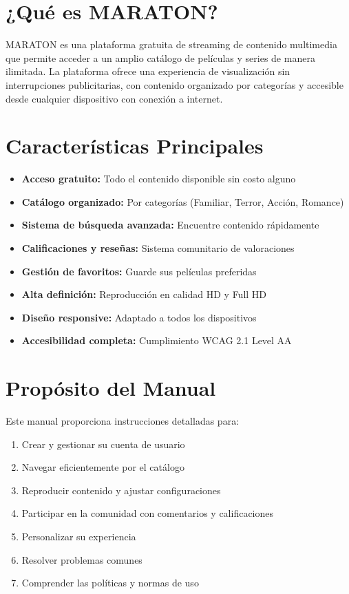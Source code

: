 \documentclass[11pt,a4paper,twoside]{book}
\begin{document}
\section{¿Qué es MARATON?}

MARATON es una plataforma gratuita de streaming de contenido multimedia que permite acceder a un amplio catálogo de películas y series de manera ilimitada. La plataforma ofrece una experiencia de visualización sin interrupciones publicitarias, con contenido organizado por categorías y accesible desde cualquier dispositivo con conexión a internet.

\section{Características Principales}

\begin{itemize}
    \item \textbf{Acceso gratuito:} Todo el contenido disponible sin costo alguno
    \item \textbf{Catálogo organizado:} Por categorías (Familiar, Terror, Acción, Romance)
    \item \textbf{Sistema de búsqueda avanzada:} Encuentre contenido rápidamente
    \item \textbf{Calificaciones y reseñas:} Sistema comunitario de valoraciones
    \item \textbf{Gestión de favoritos:} Guarde sus películas preferidas
    \item \textbf{Alta definición:} Reproducción en calidad HD y Full HD
    \item \textbf{Diseño responsive:} Adaptado a todos los dispositivos
    \item \textbf{Accesibilidad completa:} Cumplimiento WCAG 2.1 Level AA
\end{itemize}

\section{Propósito del Manual}

Este manual proporciona instrucciones detalladas para:

\begin{enumerate}
    \item Crear y gestionar su cuenta de usuario
    \item Navegar eficientemente por el catálogo
    \item Reproducir contenido y ajustar configuraciones
    \item Participar en la comunidad con comentarios y calificaciones
    \item Personalizar su experiencia
    \item Resolver problemas comunes
    \item Comprender las políticas y normas de uso
\end{enumerate}
\end{document}
